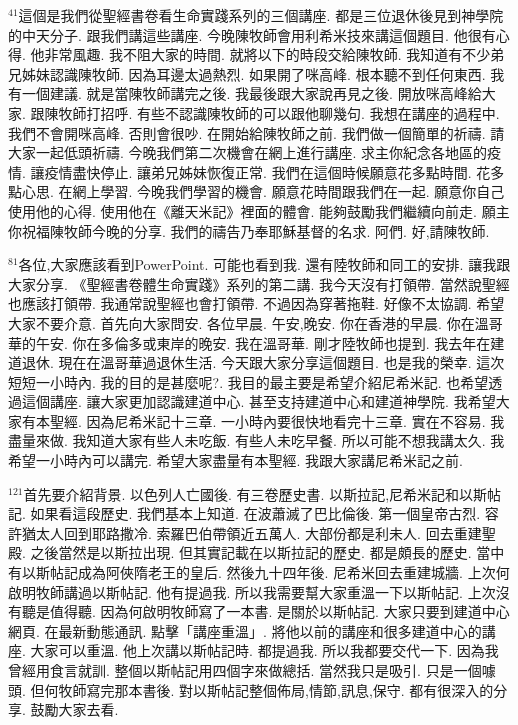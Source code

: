 \documentclass{book}
\begin{document}
$^{41}$這個是我們從聖經書卷看生命實踐系列的三個講座.
都是三位退休後見到神學院的中天分子.
跟我們講這些講座.
今晚陳牧師會用利希米技來講這個題目.
他很有心得.
他非常風趣.
我不阻大家的時間.
就將以下的時段交給陳牧師.
我知道有不少弟兄姊妹認識陳牧師.
因為耳邊太過熱烈.
如果開了咪高峰.
根本聽不到任何東西.
我有一個建議.
就是當陳牧師講完之後.
我最後跟大家說再見之後.
開放咪高峰給大家.
跟陳牧師打招呼.
有些不認識陳牧師的可以跟他聊幾句.
我想在講座的過程中.
我們不會開咪高峰.
否則會很吵.
在開始給陳牧師之前.
我們做一個簡單的祈禱.
請大家一起低頭祈禱.
今晚我們第二次機會在網上進行講座.
求主你紀念各地區的疫情.
讓疫情盡快停止.
讓弟兄姊妹恢復正常.
我們在這個時候願意花多點時間.
花多點心思.
在網上學習.
今晚我們學習的機會.
願意花時間跟我們在一起.
願意你自己使用他的心得.
使用他在《離天米記》裡面的體會.
能夠鼓勵我們繼續向前走.
願主你祝福陳牧師今晚的分享.
我們的禱告乃奉耶穌基督的名求.
阿們.
好,請陳牧師.

$^{81}$各位,大家應該看到PowerPoint.
可能也看到我.
還有陸牧師和同工的安排.
讓我跟大家分享.
《聖經書卷體生命實踐》系列的第二講.
我今天沒有打領帶.
當然說聖經也應該打領帶.
我通常說聖經也會打領帶.
不過因為穿著拖鞋.
好像不太協調.
希望大家不要介意.
首先向大家問安.
各位早晨.
午安,晚安.
你在香港的早晨.
你在溫哥華的午安.
你在多倫多或東岸的晚安.
我在溫哥華.
剛才陸牧師也提到.
我去年在建道退休.
現在在溫哥華過退休生活.
今天跟大家分享這個題目.
也是我的榮幸.
這次短短一小時內.
我的目的是甚麼呢?.
我目的最主要是希望介紹尼希米記.
也希望透過這個講座.
讓大家更加認識建道中心.
甚至支持建道中心和建道神學院.
我希望大家有本聖經.
因為尼希米記十三章.
一小時內要很快地看完十三章.
實在不容易.
我盡量來做.
我知道大家有些人未吃飯.
有些人未吃早餐.
所以可能不想我講太久.
我希望一小時內可以講完.
希望大家盡量有本聖經.
我跟大家講尼希米記之前.

$^{121}$首先要介紹背景.
以色列人亡國後.
有三卷歷史書.
以斯拉記,尼希米記和以斯帖記.
如果看這段歷史.
我們基本上知道.
在波蕭滅了巴比倫後.
第一個皇帝古烈.
容許猶太人回到耶路撒冷.
索羅巴伯帶領近五萬人.
大部份都是利未人.
回去重建聖殿.
之後當然是以斯拉出現.
但其實記載在以斯拉記的歷史.
都是頗長的歷史.
當中有以斯帖記成為阿俠隋老王的皇后.
然後九十四年後.
尼希米回去重建城牆.
上次何啟明牧師講過以斯帖記.
他有提過我.
所以我需要幫大家重溫一下以斯帖記.
上次沒有聽是值得聽.
因為何啟明牧師寫了一本書.
是關於以斯帖記.
大家只要到建道中心網頁.
在最新動態通訊.
點擊「講座重溫」.
將他以前的講座和很多建道中心的講座.
大家可以重溫.
他上次講以斯帖記時.
都提過我.
所以我都要交代一下.
因為我曾經用食言就訓.
整個以斯帖記用四個字來做總括.
當然我只是吸引.
只是一個噱頭.
但何牧師寫完那本書後.
對以斯帖記整個佈局,情節,訊息,保守.
都有很深入的分享.
鼓勵大家去看.
\end{document}
